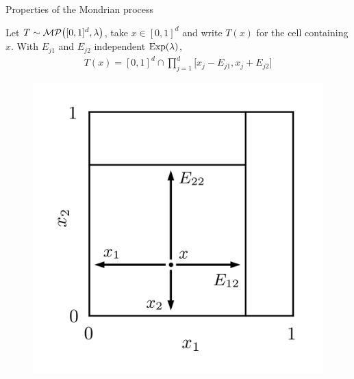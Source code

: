 \documentclass{beamer}
\begin{document}
\begin{frame}{Properties of the Mondrian process}

  \begin{minipage}{0.62\textwidth}
    \vspace*{-2mm}
    \begin{beamerlemma}
      Let $T \sim \mathcal{MP}\big([0,1]^d, \lambda\big)$,
      take $x \in [0,1]^d$
      and write $T(x)$ for the cell containing $x$.
      With $E_{j1}$ and $E_{j2}$ independent
      $\mathrm{Exp}(\lambda)$,
      \vspace*{-3mm}
      \begin{align*}
        T(x) =
        [0,1]^d \cap
        \prod_{j=1}^{d}
        \big[
          x_j - E_{j1},
          x_j + E_{j2}
        \big]
      \end{align*}
      \vspace*{-4mm}
    \end{beamerlemma}
  \end{minipage}
  \begin{minipage}{0.0\textwidth}
    \phantom{spacing}
  \end{minipage}
  \begin{minipage}{0.3\textwidth}
    \vspace*{3mm}
    \begin{figure}[ht]
      \centering
      \includegraphics[scale=0.85]{graphics/theorem_distribution.png}
    \end{figure}
  \end{minipage}


\end{frame}
\end{document}
